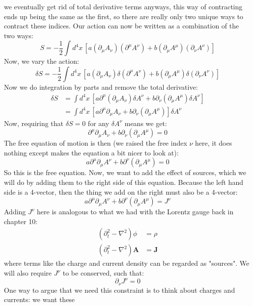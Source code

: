 we eventually get rid of total derivative terms anyways, this way of contracting ends up being the same as
the first, so there are really only two unique ways to contract these indices. Our action can now be written
as a combination of the two ways:
\[
	S = -\frac{1}{2}\int d^{4}x \, \left[ a \left( \partial_\mu A_\nu \right)\left( \partial^{\mu}A^{\nu}
	\right) + b \left( \partial_\mu A^{\mu} \right) \left( \partial_\nu A^{\nu} \right) \right]
\]
Now, we vary the action:
\[
	\delta S = -\frac{1}{2}\int d^{4}x \, \left[ a (\partial_\mu A_\nu) \delta(\partial^{\mu}A^{\nu}) + b
	(\partial_\mu A^{\mu}) \delta(\partial_\nu A^{\nu}) \right] 
\]
Now we do integration by parts and remove the total derivative:
\begin{align*}
	\delta S &= \int d^{4}x \, \left[ a \partial^{\mu} (\partial_\mu A_\nu) \delta A^{\nu} + b
	\partial_\nu(\partial_\mu A^{\mu}) \delta A^{\nu} \right] \\ 
	&= \int d^{4}x \, \left[ a \partial^{\mu}\partial_\mu A_\nu + b \partial_\nu \left( \partial_\mu A^{\mu}
	\right) \right] \delta A^{\nu} 
\end{align*}
Now, requiring that \( \delta S = 0 \) for any \( \delta A^{\nu} \) means we get:
\[
	\partial^{\mu} \partial_\mu A_\nu + b \partial_\nu (\partial_\mu A^{\mu}) = 0
\]
The free equation of motion is then (we raised the free index \( \nu \) here, it does nothing except makes
the equation a bit nicer to look at):
\[
	a \partial^{\mu} \partial_\mu A^{\nu} + b \partial^{\nu}(\partial_\mu A^{\mu}) = 0
\]
So this is the free equation. Now, we want to add the effect of sources, which we will do by adding them to
the right side of this equation. Because the left hand side is a 4-vector, then the thing we add on the right
must also be a 4-vector:
\begin{equation}
	\label{vector-action}
	a \partial^{\mu} \partial_\mu A^{\nu} + b \partial^{\nu} (\partial_\mu A^{\mu}) = J^{\nu}
\end{equation}
Adding \( J^{\nu} \) here is analogous to what we had with the Lorentz gauge back in chapter 10: 
\begin{align*}
	(\partial_t^2 - \nabla^2) \phi &= \rho\\
	(\partial_t^2 - \nabla^2) \mathbf{A} &= \mathbf{J}
\end{align*}
where terms like the charge and current density can be regarded as "sources".  We will also require \( J^{\nu} \)
to be conserved, such that:
\[
	\partial_\nu J^{\nu} = 0
\]
One way to argue that we need this constraint is to think about charges and currents: we want these
